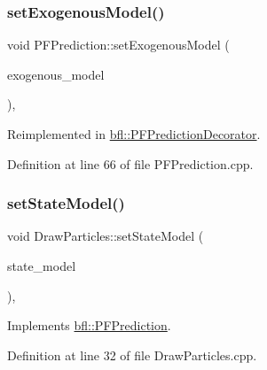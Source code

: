 \subsubsection{\texorpdfstring{set\+Exogenous\+Model()}{setExogenousModel()}}
{\footnotesize\ttfamily void P\+F\+Prediction\+::set\+Exogenous\+Model (\begin{DoxyParamCaption}\item[{std\+::unique\+\_\+ptr$<$ \mbox{\hyperlink{classbfl_1_1ExogenousModel}{Exogenous\+Model}} $>$}]{exogenous\+\_\+model }\end{DoxyParamCaption})\hspace{0.3cm}{\ttfamily [virtual]}, {\ttfamily [inherited]}}



Reimplemented in \mbox{\hyperlink{classbfl_1_1PFPredictionDecorator_a3c38ae386456ecd0fd1b609b381395ec}{bfl\+::\+P\+F\+Prediction\+Decorator}}.



Definition at line 66 of file P\+F\+Prediction.\+cpp.

\mbox{\label{classbfl_1_1DrawParticles_acb607ab90c22a43a72a75576acb898a4}} 
\subsubsection{\texorpdfstring{set\+State\+Model()}{setStateModel()}}
{\footnotesize\ttfamily void Draw\+Particles\+::set\+State\+Model (\begin{DoxyParamCaption}\item[{std\+::unique\+\_\+ptr$<$ \mbox{\hyperlink{classbfl_1_1StateModel}{State\+Model}} $>$}]{state\+\_\+model }\end{DoxyParamCaption})\hspace{0.3cm}{\ttfamily [override]}, {\ttfamily [virtual]}}



Implements \mbox{\hyperlink{classbfl_1_1PFPrediction_ac39683650d7f89c59f1426dd7743354e}{bfl\+::\+P\+F\+Prediction}}.



Definition at line 32 of file Draw\+Particles.\+cpp.

\mbox{\label{classbfl_1_1PFPrediction_a364cc35a151e5298c4024d681f3e04d9}} 
